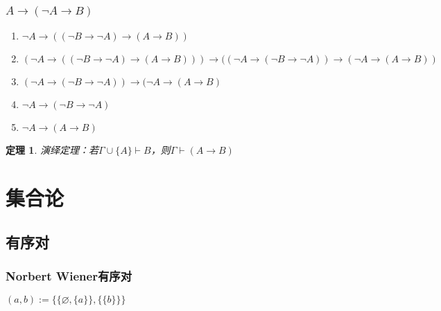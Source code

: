 \documentclass[UTF8]{ctexbook}
\newtheorem{theorem}{定理}
\begin{document}
\subsection{$A\rightarrow (\neg A\rightarrow B)$}
\begin{enumerate}
	\item $\neg A\rightarrow ((\neg B\rightarrow \neg A)\rightarrow (A\rightarrow B))$
	\item $(\neg A\rightarrow ((\neg B\rightarrow \neg A)\rightarrow (A\rightarrow B)))\rightarrow ((\neg A\rightarrow (\neg B\rightarrow \neg A))\rightarrow (\neg A \rightarrow (A\rightarrow B))$
	\item $(\neg A\rightarrow (\neg B\rightarrow \neg A))\rightarrow (\neg A \rightarrow (A\rightarrow B)$
	\item $\neg A\rightarrow (\neg B\rightarrow \neg A)$
	\item $\neg A\rightarrow (A\rightarrow B)$
\end{enumerate}

\begin{theorem}
	演绎定理：若$\Gamma\cup \{A\}\vdash B$，则$\Gamma \vdash (A\rightarrow B)$
\end{theorem}

\chapter{集合论}
\section{有序对}
\subsection{Norbert Wiener有序对}
	$(a, b):=\{ \{ \varnothing , \{ a\} \} , \{ \{ b\} \} \}$


\end{document}
